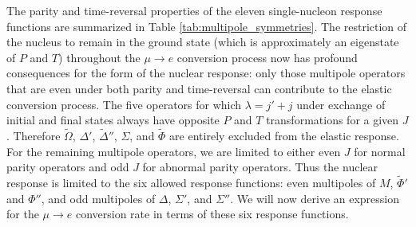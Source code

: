 \documentclass[12pt,letterpaper]{book}
\begin{document}
The parity and time-reversal properties of the eleven single-nucleon response functions are summarized in Table \ref{tab:multipole_symmetries}. The restriction of the nucleus to remain in the ground state (which is approximately an eigenstate of $P$ and $T$) throughout the $\mu\rightarrow e$ conversion process now has profound consequences for the form of the nuclear response: only those multipole operators that are even under both parity and time-reversal can contribute to the elastic conversion process. The five operators for which $\lambda=j'+j$ under exchange of initial and final states always have opposite $P$ and $T$ transformations for a given $J$. Therefore $\tilde{\Omega}$, $\Delta'$, $\tilde{\Delta}''$, $\Sigma$, and $\tilde{\Phi}$ are entirely excluded from the elastic response. For the remaining multipole operators, we are limited to either even $J$ for normal parity operators and odd $J$ for abnormal parity operators.  Thus the nuclear response is limited to the six allowed response functions: even multipoles of $M$, $\tilde{\Phi}'$ and $\Phi''$, and odd multipoles of $\Delta$, $\Sigma'$, and $\Sigma''$. We will now derive an expression for the $\mu\rightarrow e$ conversion rate in terms of these six response functions.
\end{document}

